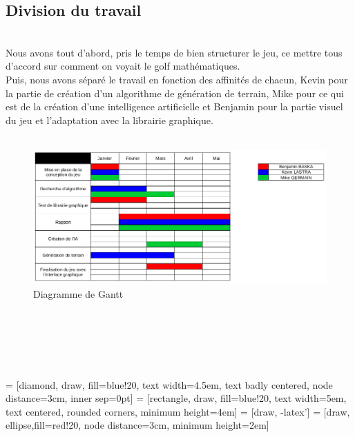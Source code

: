\documentclass{article}
\begin{document}
\subsection{Division du travail}
~\\
Nous avons tout d'abord, pris le temps de bien structurer le jeu, ce mettre tous d'accord sur comment on voyait le golf mathématiques.\\
Puis, nous avons séparé le travail en fonction des affinités de chacun, Kevin pour la partie de création d'un algorithme de génération de terrain, Mike pour ce qui est de la création d'une intelligence artificielle et Benjamin pour la partie visuel du jeu et l'adaptation avec la librairie graphique.
\\~\\
\begin{figure}[!h]
\centering
\includegraphics[scale=0.3]{Images/driagram.png}
\caption{Diagramme de Gantt}
\end{figure}
~\\~\\~\\~\\~\\
 = [diamond, draw, fill=blue!20, 
    text width=4.5em, text badly centered, node distance=3cm, inner sep=0pt]
 = [rectangle, draw, fill=blue!20, 
    text width=5em, text centered, rounded corners, minimum height=4em]
 = [draw, -latex']
 = [draw, ellipse,fill=red!20, node distance=3cm,
    minimum height=2em]
\end{document}
